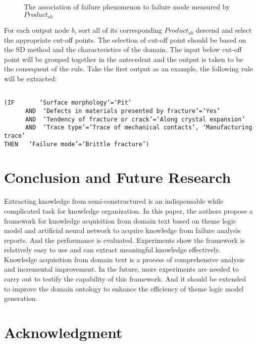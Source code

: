 \documentclass{elsarticle}
\begin{document}
 \begin{figure}[htb]
  \centering
  \caption{The association of failure phenomenon to failure mode measured by $Product_{ab}$
}
\label{fig:7}
\end{figure}

For each output node $b$, sort all of its corresponding $Product_{ab}$
descend and select the appropriate cut-off points. The selection of
cut-off point should be based on the SD method and the characteristics
of the domain. The input below cut-off point will be grouped together
in the antecedent and the output is taken to be the consequent of the
rule. Take the first output as an example, the following rule will be
extracted:
\begin{verbatim}

(IF       ‘Surface morphology’=‘Pit’ 
      AND  ‘Defects in materials presented by fracture’=‘Yes’
      AND  ‘Tendency of fracture or crack’=‘Along crystal expansion’
      AND  ‘Trace type’=‘Trace of mechanical contacts’, ‘Manufacturing trace’
THEN   ‘Failure mode’=‘Brittle fracture’)

\end{verbatim}

\section{Conclusion and Future Research 
}
\label{sec:concl-future-rese}

Extracting knowledge from semi-constructured is an indispensable while
complicated task for knowledge organization. In this paper, the authors
propose a framework for knowledge acquisition from domain text
based on theme logic model and artificial neural network to acquire knowledge from
failure analysis reports. And the  performance is evaluated. Experiments show the framework is relatively
easy to use and can extract meaningful knowledge effectively. 
Knowledge acquisition from domain text is a process of comprehensive
analysis and incremental improvement. In the future, more experiments are
needed to carry out to testify the capability of this framework. And
it should be extended to improve the domain ontology to enhance the
efficiency of theme logic model generation.

\section{Acknowledgment}
\label{sec:acknowledgment}
\end{document}
